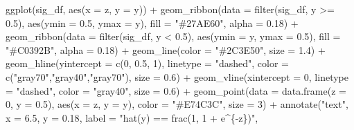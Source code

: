 \documentclass[
  letterpaper,
  DIV=11,
  numbers=noendperiod]{scrartcl}
\newenvironment{Shaded}{\begin{snugshade}}{\end{snugshade}}
\newcommand{\AttributeTok}[1]{\textcolor[rgb]{0.40,0.45,0.13}{#1}}
\newcommand{\DecValTok}[1]{\textcolor[rgb]{0.68,0.00,0.00}{#1}}
\newcommand{\FloatTok}[1]{\textcolor[rgb]{0.68,0.00,0.00}{#1}}
\newcommand{\FunctionTok}[1]{\textcolor[rgb]{0.28,0.35,0.67}{#1}}
\newcommand{\NormalTok}[1]{\textcolor[rgb]{0.00,0.23,0.31}{#1}}
\newcommand{\SpecialCharTok}[1]{\textcolor[rgb]{0.37,0.37,0.37}{#1}}
\newcommand{\StringTok}[1]{\textcolor[rgb]{0.13,0.47,0.30}{#1}}
\begin{document}
\begin{Shaded}
\begin{Highlighting}[]
\FunctionTok{ggplot}\NormalTok{(sig\_df, }\FunctionTok{aes}\NormalTok{(}\AttributeTok{x =}\NormalTok{ z, }\AttributeTok{y =}\NormalTok{ y)) }\SpecialCharTok{+}
  \FunctionTok{geom\_ribbon}\NormalTok{(}\AttributeTok{data =} \FunctionTok{filter}\NormalTok{(sig\_df, y }\SpecialCharTok{\textgreater{}=} \FloatTok{0.5}\NormalTok{),}
              \FunctionTok{aes}\NormalTok{(}\AttributeTok{ymin =} \FloatTok{0.5}\NormalTok{, }\AttributeTok{ymax =}\NormalTok{ y), }\AttributeTok{fill =} \StringTok{"\#27AE60"}\NormalTok{, }\AttributeTok{alpha =} \FloatTok{0.18}\NormalTok{) }\SpecialCharTok{+}
  \FunctionTok{geom\_ribbon}\NormalTok{(}\AttributeTok{data =} \FunctionTok{filter}\NormalTok{(sig\_df, y }\SpecialCharTok{\textless{}} \FloatTok{0.5}\NormalTok{),}
              \FunctionTok{aes}\NormalTok{(}\AttributeTok{ymin =}\NormalTok{ y, }\AttributeTok{ymax =} \FloatTok{0.5}\NormalTok{), }\AttributeTok{fill =} \StringTok{"\#C0392B"}\NormalTok{, }\AttributeTok{alpha =} \FloatTok{0.18}\NormalTok{) }\SpecialCharTok{+}
  \FunctionTok{geom\_line}\NormalTok{(}\AttributeTok{color =} \StringTok{"\#2C3E50"}\NormalTok{, }\AttributeTok{size =} \FloatTok{1.4}\NormalTok{) }\SpecialCharTok{+}
  \FunctionTok{geom\_hline}\NormalTok{(}\AttributeTok{yintercept =} \FunctionTok{c}\NormalTok{(}\DecValTok{0}\NormalTok{, }\FloatTok{0.5}\NormalTok{, }\DecValTok{1}\NormalTok{), }\AttributeTok{linetype =} \StringTok{"dashed"}\NormalTok{,}
             \AttributeTok{color =} \FunctionTok{c}\NormalTok{(}\StringTok{"gray70"}\NormalTok{,}\StringTok{"gray40"}\NormalTok{,}\StringTok{"gray70"}\NormalTok{), }\AttributeTok{size =} \FloatTok{0.6}\NormalTok{) }\SpecialCharTok{+}
  \FunctionTok{geom\_vline}\NormalTok{(}\AttributeTok{xintercept =} \DecValTok{0}\NormalTok{, }\AttributeTok{linetype =} \StringTok{"dashed"}\NormalTok{, }\AttributeTok{color =} \StringTok{"gray40"}\NormalTok{, }\AttributeTok{size =} \FloatTok{0.6}\NormalTok{) }\SpecialCharTok{+}
  \FunctionTok{geom\_point}\NormalTok{(}\AttributeTok{data =} \FunctionTok{data.frame}\NormalTok{(}\AttributeTok{z =} \DecValTok{0}\NormalTok{, }\AttributeTok{y =} \FloatTok{0.5}\NormalTok{),}
             \FunctionTok{aes}\NormalTok{(}\AttributeTok{x =}\NormalTok{ z, }\AttributeTok{y =}\NormalTok{ y), }\AttributeTok{color =} \StringTok{"\#E74C3C"}\NormalTok{, }\AttributeTok{size =} \DecValTok{3}\NormalTok{) }\SpecialCharTok{+}
  \FunctionTok{annotate}\NormalTok{(}\StringTok{"text"}\NormalTok{, }\AttributeTok{x =} \FloatTok{6.5}\NormalTok{, }\AttributeTok{y =} \FloatTok{0.18}\NormalTok{,}
           \AttributeTok{label =} \StringTok{"hat(y) == frac(1, 1 + e\^{}\{{-}z\})"}\NormalTok{,}

\end{Highlighting}
\end{Shaded}
\end{document}

